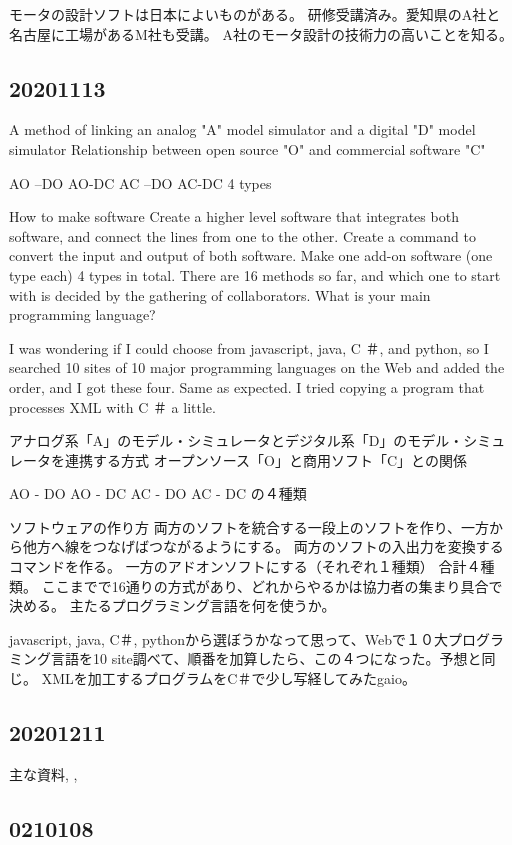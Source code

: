 \documentclass[twocolumn]{article} %
\begin{document}
モータの設計ソフトは日本によいものがある。
研修受講済み。愛知県のA社と名古屋に工場があるM社も受講。
A社のモータ設計の技術力の高いことを知る。
\subsection{20201113}
A method of linking an analog "A" model simulator and a digital "D" model simulator
Relationship between open source "O" and commercial software "C"

AO --DO
AO-DC
AC --DO
AC-DC
4 types

How to make software
Create a higher level software that integrates both software, and connect the lines from one to the other.
Create a command to convert the input and output of both software.
Make one add-on software (one type each)
4 types in total.
There are 16 methods so far, and which one to start with is decided by the gathering of collaborators.
What is your main programming language?

I was wondering if I could choose from javascript, java, C ＃, and python, so I searched 10 sites of 10 major programming languages on the Web and added the order, and I got these four. Same as expected.
I tried copying a program that processes XML with C ＃ a little. 


アナログ系「A」のモデル・シミュレータとデジタル系「D」のモデル・シミュレータを連携する方式
オープンソース「O」と商用ソフト「C」との関係

AO - DO
AO - DC
AC - DO
AC - DC
の４種類

ソフトウェアの作り方
両方のソフトを統合する一段上のソフトを作り、一方から他方へ線をつなげばつながるようにする。
両方のソフトの入出力を変換するコマンドを作る。
一方のアドオンソフトにする（それぞれ１種類）
合計４種類。
ここまでで16通りの方式があり、どれからやるかは協力者の集まり具合で決める。
主たるプログラミング言語を何を使うか。

javascript, java, C＃, pythonから選ぼうかなって思って、Webで１０大プログラミング言語を10 site調べて、順番を加算したら、この４つになった。予想と同じ。
XMLを加工するプログラムをC＃で少し写経してみた\cite{}gaio。


\subsection{20201211}

主な資料\cite{TOPPERSmail}, \cite{UML}, \cite{nakamura}

\subsection{0210108}
\end{document}
